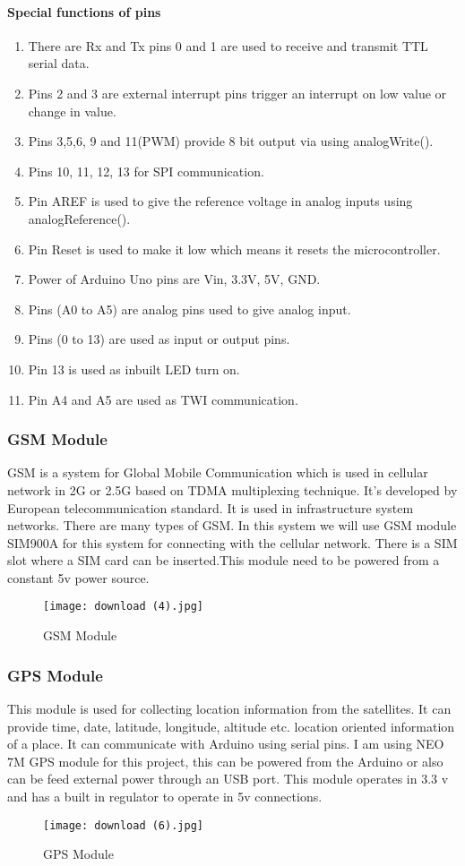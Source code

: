 \documentclass[12pt, top = 1 inch, bottom = 1 inch, left = 1.2 inch, top = .8 inch]{book}
\begin{document}
			\paragraph{Special functions of pins}
			\begin{enumerate}
				\item There are Rx and Tx pins 0 and 1 are used to receive and transmit TTL serial data.
				\item Pins 2 and 3 are external interrupt pins trigger an interrupt on low value or change in value.
				\item Pins 3,5,6, 9 and 11(PWM) provide 8 bit output via using analogWrite(). 
				\item Pins 10, 11, 12, 13 for SPI communication. 
				\item Pin AREF is used to give the reference voltage in analog inputs using analogReference().
				\item Pin Reset is used to make it low which means it resets the microcontroller. 
				\item Power of Arduino Uno pins are Vin, 3.3V, 5V, GND.
				\item Pins (A0 to A5) are analog pins used to give analog input.
				\item Pins (0 to 13) are used as input or output pins. 
				\item Pin 13 is used as inbuilt LED turn on. 
				\item Pin A4 and A5 are used as TWI communication. 		
			\end{enumerate}
			\subsubsection{GSM Module}
			GSM is a system for Global Mobile Communication which is used in cellular network in 2G or 2.5G based on TDMA multiplexing technique. It’s developed by European telecommunication standard. It is used in infrastructure system networks. There are many types of GSM. In this system we will use GSM module SIM900A for this system for connecting with the cellular network.  There is a SIM slot where a SIM card can be inserted.This module need to be powered from a constant 5v power source. 
			\begin{figure}	
				\centering
				\texttt{[image: download (4).jpg]}
				\caption{GSM Module}
			\end{figure}
			\subsubsection{GPS Module}
			This module is used for collecting location information from the satellites. It can provide time, date, latitude, longitude, altitude etc. location oriented information of a place. It can communicate with Arduino using serial pins. I am using NEO 7M GPS module for this project, this can be powered from the Arduino or also can be feed external power through an USB port. This module operates in 3.3 v and has a built in regulator to operate in 5v connections.  
			\begin{figure}	
				\centering
				\texttt{[image: download (6).jpg]}
				\caption{GPS Module}
			\end{figure}
\end{document}
